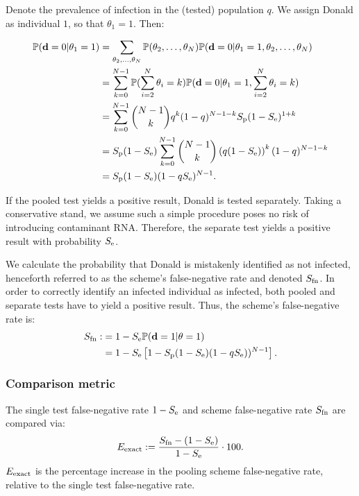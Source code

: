 \documentclass{article}
\begin{document}
Denote the prevalence of infection in the (tested) population $q$. We
assign Donald as individual $1$, so that $\theta_1=1$. Then:

\begin{align}
  \begin{split}
    \mathbb{P}(\mathbf{d}=0|\theta_1=1) &= \sum_{\theta_2,\dots,\theta_N}
    \mathbb{P}(\theta_2,\dots,\theta_N)
    \mathbb{P}(\mathbf{d}=0|\theta_1=1,\theta_2,\dots,\theta_N) \\
    &= \sum_{k=0}^{N-1}\mathbb{P}(\sum_{i=2}^N\theta_i=k)
    \mathbb{P}(\mathbf{d}=0|\theta_1=1,\sum_{i=2}^N\theta_i = k)\\
    &= \sum_{k=0}^{N-1}\binom{N-1}{k}q^k(1-q)^{N-1-k} S_\text{p}(1-S_\text{e})^{1+k}\\
    &= S_\text{p}(1-S_\text{e}) \sum_{k=0}^{N-1}\binom{N-1}{k}
    \left(q(1-S_\text{e})\right)^k(1-q)^{N-1-k}\\
    &= S_\text{p}(1-S_\text{e})(1-qS_\text{e})^{N-1}. \\
  \end{split}
\end{align}

If the pooled test yields a positive result, Donald is tested
separately. Taking a conservative stand, we assume such a simple
procedure poses no risk of introducing contaminant RNA. Therefore, the
separate test yields a positive result with probability $S_\text{e}$.

We calculate the probability that Donald is mistakenly identified as
not infected, henceforth referred to as the scheme's false-negative
rate and denoted $S_{\text{fn}}$. In order to correctly identify an infected individual
as infected, both pooled and separate tests have to yield a positive
result. Thus, the scheme's false-negative rate is:
\begin{align}\label{eq:sfn}
    \begin{split}
        S_{\text{fn}} :&= 1 - S_\text{e}\mathbb{P}(\mathbf{d}=1|\theta=1)\\
        &= 1 - S_\text{e}\left [1 - S_\text{p}(1-S_\text{e})(1-qS_\text{e}))^{N-1}\right].
    \end{split}
\end{align}

\subsubsection*{Comparison metric}
The single test false-negative rate $1-S_\text{e}$ and scheme false-negative
rate $S_{\text{fn}}$ are compared via:
\begin{equation}\label{eq:erel}
E_{\text{{exact}}} := \frac{S_{\text{fn}} - (1-S_\text{e})}{1-S_\text{e}} \cdot 100.
\end{equation}
$E_{\text{{exact}}}$ is the percentage increase in the pooling scheme
false-negative rate, relative to the single test false-negative rate.
\end{document}
